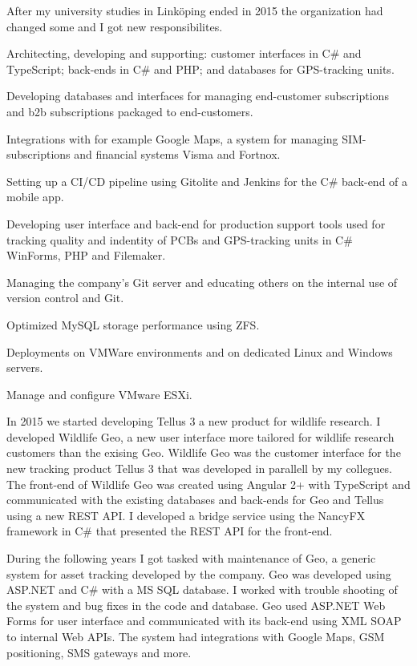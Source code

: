 \documentclass{cv-stylish}
\begin{document}
\begin{center}
\begin{adjustwidth}{0.015\linewidth}{0.015\linewidth}
After my university studies in Linköping ended in 2015 the organization
had changed some and I got new responsibilites.

\begin{compactitem}
  \item Architecting, developing and supporting: customer interfaces in
    C\# and TypeScript; back-ends in C\# and PHP; and databases for
    GPS-tracking units.
  \item Developing databases and interfaces for managing end-customer
    subscriptions and b2b subscriptions packaged to end-customers.
  \item Integrations with for example Google Maps, a system for managing
    SIM-subscriptions and financial systems Visma and Fortnox.
  \item Setting up a CI/CD pipeline using Gitolite and Jenkins for the C\#
    back-end of a mobile app.
  \item Developing user interface and back-end for production support
    tools used for tracking quality and indentity of PCBs and GPS-tracking
    units in C\# WinForms, PHP and Filemaker.
  \item Managing the company's Git server and educating others on the
    internal use of version control and Git.
  \item Optimized MySQL storage performance using ZFS.
  \item Deployments on VMWare environments and on dedicated Linux and
    Windows servers.
  \item Manage and configure VMware ESXi.
\end{compactitem}

In 2015 we started developing Tellus 3 a new product for wildlife
research. I developed Wildlife Geo, a new user interface more tailored
for wildlife research customers than the exising Geo.
Wildlife Geo was the customer interface for the new tracking product
Tellus 3 that was developed in parallell by my collegues.
The front-end of Wildlife Geo was created using Angular 2+ with
TypeScript and communicated with the existing databases and back-ends
for Geo and Tellus using a new REST API. I developed a bridge service
using the NancyFX framework in C\# that presented the REST API for the
front-end.

During the following years I got tasked with maintenance of Geo, a
generic system for asset tracking developed by the company.
Geo was developed using ASP.NET and C\# with a MS SQL database.
I worked with trouble shooting of the system and bug fixes in the code
and database.
Geo used ASP.NET Web Forms for user interface and communicated with
its back-end using XML SOAP to internal Web APIs. The system had
integrations with Google Maps, GSM positioning, SMS gateways and
more.


\end{adjustwidth}
\end{center}
\end{document}
